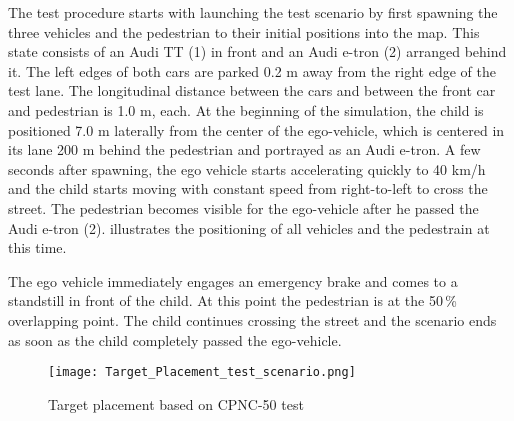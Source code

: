 The test procedure starts with launching the test scenario by first spawning the three vehicles and the pedestrian to their initial positions into the map. This state consists of an Audi TT (1) in front and an Audi e-tron (2) arranged behind it. The left edges of both cars are parked 0.2 m away from the right edge of the test lane. The longitudinal distance between the cars and between the front car and pedestrian is 1.0 m, each. At the beginning of the simulation, the child is positioned 7.0 m laterally from the center of the ego-vehicle, which is centered in its lane 200 m behind the pedestrian and portrayed as an Audi e-tron. A few seconds after spawning, the ego vehicle starts accelerating quickly to 40 km/h and the child starts moving with constant speed from right-to-left to cross the street. The pedestrian becomes visible for the ego-vehicle after he passed the Audi e-tron (2).  illustrates the positioning of all vehicles and the pedestrain at this time.





The ego vehicle immediately engages an emergency brake and comes to a standstill in front of the child. At this point the pedestrian is at the 50\,\% overlapping point. The child continues crossing the street and the scenario ends as soon as the child completely passed the ego-vehicle.
\begin{figure}[htbp]
	\centering
	\texttt{[image: Target\_Placement\_test\_scenario.png]}
	\caption{Target placement based on CPNC-50 test \cite{Protocoll}}
	\label{fig:coordination}
\end{figure}

